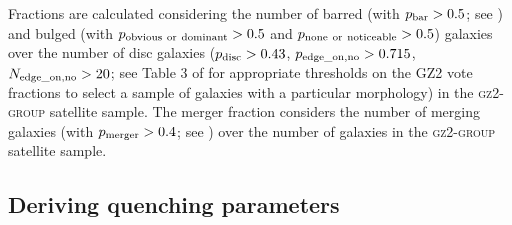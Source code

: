 \documentclass[useAMS,usenatbib]{mn2e}
\begin{document}
Fractions are calculated considering the number of barred (with $p_{\rm{bar}} > 0.5$; see \citealt{masters11a, Cheung13}) and bulged (with $p_{\rm{obvious}~\rm{or}~\rm{dominant}} > 0.5$ and $p_{\rm{none}~\rm{or}~\rm{noticeable}} > 0.5$) galaxies over the number of disc galaxies ($p_{\rm{disc}} > 0.43$, $p_{\rm{edge\_on, no}} > 0.715$, $N_{\rm{edge\_on, no}} > 20$; see Table 3 of \citealt{GZ2} for appropriate thresholds on the GZ2 vote fractions to select a sample of galaxies with a particular morphology) in the \textsc{gz2-group} satellite sample. The merger fraction considers the number of merging galaxies (with $p_{\rm{merger}} > 0.4$; see \citealt{Darg10a}) over the number of galaxies in the \textsc{gz2-group} satellite sample. 


\subsection{Deriving quenching parameters}\label{sec:starpy}
\end{document}
